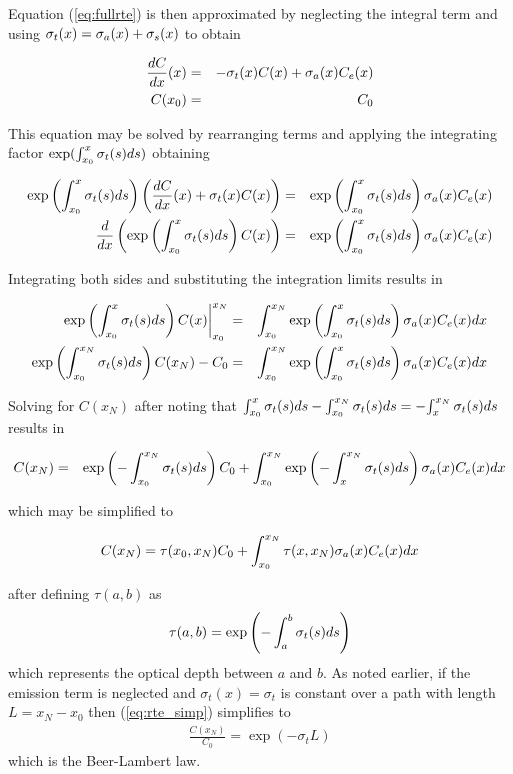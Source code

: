 Equation (\ref{eq:fullrte}) is then approximated by neglecting the integral term and using $\sigma_t(x)=\sigma_a(x)+\sigma_s(x)$ to obtain

\begin{eqnarray*}
\frac{dC}{dx}(x)&=&-\sigma_t(x) C(x) + \sigma_a(x) C_e(x)\\
 C(x_0)&=&C_0
\end{eqnarray*}

This equation may be solved by rearranging terms and applying the integrating factor $\exp(\int_{x_0}^x \sigma_t(s) ds)$ obtaining

\begin{eqnarray*}
\exp\left({\int_{x_0}^{x} \sigma_t(s) ds}\right)\left(\frac{dC}{dx}(x)+\sigma_t(x) C(x)\right)&=&  \exp\left({\int_{x_0}^{x} \sigma_t(s) ds}\right)\sigma_a(x) C_e(x)\\
\frac{d}{dx}\left(\exp\left({\int_{x_0}^{x} \sigma_t(s) ds}\right) C(x)\right)&=& \exp\left({\int_{x_0}^{x} \sigma_t(s) ds}\right)\sigma_a(x) C_e(x)
\end{eqnarray*}

Integrating both sides and substituting the integration limits results in

\begin{eqnarray*}
\left.\exp\left({\int_{x_0}^{x} \sigma_t(s) ds}\right) C(x)\right|_{x_0}^{x_N}&=& \int_{x_0}^{x_N}\exp\left({\int_{x_0}^{x} \sigma_t(s) ds}\right)\sigma_a(x) C_e(x) dx \\
\exp\left({\int_{x_0}^{x_N} \sigma_t(s) ds}\right) C(x_N)-C_0&=& \int_{x_0}^{x_N}\exp\left({\int_{x_0}^{x} \sigma_t(s) ds}\right)\sigma_a(x) C_e(x) dx
\end{eqnarray*}

Solving for $C(x_N)$ after noting that ${\int_{x_0}^{x} \sigma_t(s) ds}-{\int_{x_0}^{x_N} \sigma_t(s) ds}=-{\int_{x}^{x_N} \sigma_t(s) ds}$ results in

\begin{eqnarray*}
C(x_N)&=&\exp\left({-\int_{x_0}^{x_N} \sigma_t(s) ds}\right) C_0+ \int_{x_0}^{x_N}\exp\left({-\int_{x}^{x_N} \sigma_t(s) ds}\right)\sigma_a(x) C_e(x) dx\\
\end{eqnarray*}

which may be simplified to

\begin{equation}
\label{eq:rte_simp}
\label{eq:rtesoln}
 C(x_N)=\tau(x_0,x_N)C_0 + \int_{x_0}^{x_N}\tau(x,x_N)\sigma_a(x)C_e(x) dx
\end{equation}

after defining $\tau(a,b)$ as
\begin{equation}
\label{eq:optdepth}
\tau(a,b)=\exp\left({-\int_{a}^{b} \sigma_t(s) ds}\right)
\end{equation}
which represents the optical depth between $a$ and $b$.  As noted earlier, if the emission term is neglected and $\sigma_t(x)=\sigma_t$ is constant over a path with length
$L=x_N-x_0$ then (\ref{eq:rte_simp}) simplifies to
\begin{eqnarray*}
 \frac{C(x_N)}{C_0}=\exp(-\sigma_tL)
\end{eqnarray*}
which is the Beer-Lambert law.

